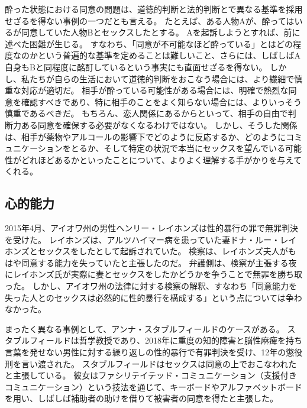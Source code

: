 \documentclass[paper=a4,book,openany]{jlreq}
\begin{document}
酔った状態における同意の問題は、道徳的判断と法的判断とで異なる基準を採用せざるを得ない事例の一つだとも言える。
たとえば、ある人物Aが、酔ってはいるが同意していた人物Bとセックスしたとする。
Aを起訴しようとすれば、前に述べた困難が生じる。
すなわち、「同意が不可能なほど酔っている」とはどの程度なのかという普遍的な基準を定めることは難しいこと、さらには、しばしばA自身もBと同程度に酩酊しているという事実にも直面せざるを得ない。
しかし、私たちが自らの生活において道徳的判断をおこなう場合には、より繊細で慎重な対応が適切だ。
相手が酔っている可能性がある場合には、明確で熱烈な同意を確認すべきであり、特に相手のことをよく知らない場合には、よりいっそう慎重であるべきだ。
もちろん、恋人関係にあるからといって、相手の自由で判断力ある同意を確保する必要がなくなるわけではない。
しかし、そうした関係は、相手が薬物やアルコールの影響下でどのように反応するか、どのようにコミュニケーションをとるか、そして特定の状況で本当にセックスを望んでいる可能性がどれほどあるかといったことについて、よりよく理解する手がかりを与えてくれる。

\subsection{心的能力}

2015年4月、アイオワ州の男性ヘンリー・レイホンズは性的暴行の罪で無罪判決を受けた。
レイホンズは、アルツハイマー病を患っていた妻ドナ・ルー・レイホンズとセックスをしたとして起訴されていた。
検察は、レイホンズ夫人がもはや同意する能力を失っていたと主張したのだ。
弁護側は、検察が主張する夜にレイホンズ氏が実際に妻とセックスをしたかどうかを争うことで無罪を勝ち取った。
しかし、アイオワ州の法律に対する検察の解釈、すなわち「同意能力を失った人とのセックスは必然的に性的暴行を構成する」という点については争わなかった\citep{belluck15:_sex_demen_husban_trial_age}。

まったく異なる事例として、アンナ・スタブルフィールドのケースがある。
スタブルフィールドは哲学教授であり、2018年に重度の知的障害と脳性麻痺を持ち言葉を発せない男性に対する繰り返しの性的暴行で有罪判決を受け、12年の懲役刑を言い渡された。
スタブルフィールドはセックスは同意の上でおこなわれたと主張している。
彼女はファシリテイテッド・コミュニケーション（支援付きコミュニケーション）という技法を通じて、キーボードやアルファベットボードを用い、しばしば補助者の助けを借りて被害者の同意を得たと主張した\citep{engber15:_stran_case_anna_stubb}。
\end{document}
